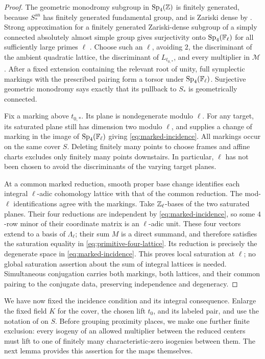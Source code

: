 \begin{proof}
The geometric monodromy subgroup in $\operatorname{Sp}_4(\mathbb Z)$ is finitely generated,
because $S_*^{\mathrm{an}}$ has finitely generated fundamental group, and
is Zariski dense by .  Strong approximation for a
finitely generated Zariski-dense subgroup of a simply connected absolutely
almost simple group gives surjectivity onto $\operatorname{Sp}_4(\mathbb F_\ell)$ for all
sufficiently large primes $\ell$ \cite[Theorem, p.~515]{MVW1984}.  Choose
such an $\ell$, avoiding $2$, the discriminant of the ambient quadratic
lattice, the discriminant of $L_{t_{0,*}}$, and every multiplier in
$\mathcal M$.  After a fixed extension containing the relevant root of
unity, full symplectic markings with the prescribed pairing form a torsor
under $\operatorname{Sp}_4(\mathbb F_\ell)$.  Surjective geometric monodromy says exactly
that its pullback to $S_*$ is geometrically connected.

Fix a marking above $t_{0,*}$.  Its plane is nondegenerate modulo $\ell$.
For any target, its saturated plane still has dimension two modulo
$\ell$, and  supplies a change of marking
in the image of $\operatorname{Sp}_4(\mathbb F_\ell)$ giving
\eqref{eq:marked-incidence}.  All markings occur on the same cover $S$.
Deleting finitely many points to choose frames and affine charts excludes
only finitely many points downstairs.  In particular, $\ell$ has not been
chosen to avoid the discriminants of the varying target planes.

At a common marked reduction, smooth proper base change identifies each
integral $\ell$-adic cohomology lattice with that of the common reduction.
The mod-$\ell$ identifications agree with the markings.  Take
$\mathbb Z_\ell$-bases of the two saturated planes.  Their four reductions are
independent by \eqref{eq:marked-incidence}, so some $4$-row minor of their
coordinate matrix is an $\ell$-adic unit.  These four vectors extend to a
basis of $\Lambda_\ell$; their sum $M$ is a direct summand, and therefore
satisfies the saturation equality in \eqref{eq:primitive-four-lattice}.
Its reduction is precisely the degenerate space in
\eqref{eq:marked-incidence}.  This proves local saturation at $\ell$;
no global saturation assertion about the sum of integral lattices is
needed.  Simultaneous conjugation carries both markings, both lattices,
and their common pairing to the conjugate data, preserving independence
and degeneracy.
\end{proof}

We have now fixed the incidence condition and its integral consequence.
Enlarge the fixed field $K$ for the cover, the chosen lift $t_0$, and its
labeled pair, and use the notation of  on $S$.
Before grouping proximity places, we make one further finite exclusion:
every isogeny of an allowed multiplier between the reduced centers must
lift to one of finitely many characteristic-zero isogenies between them.  The next
lemma provides this assertion for the maps themselves.

